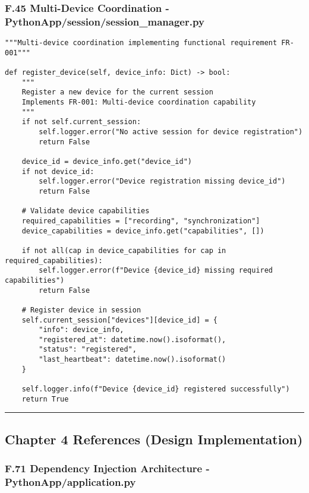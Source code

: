 \documentclass[11pt,a4paper]{article}
\begin{document}
\subsubsection{F.45 Multi-Device Coordination - PythonApp/session/session_manager.py}

\begin{verbatim}
"""Multi-device coordination implementing functional requirement FR-001"""

def register_device(self, device_info: Dict) -> bool:
    """
    Register a new device for the current session
    Implements FR-001: Multi-device coordination capability
    """
    if not self.current_session:
        self.logger.error("No active session for device registration")
        return False

    device_id = device_info.get("device_id")
    if not device_id:
        self.logger.error("Device registration missing device_id")
        return False

    # Validate device capabilities
    required_capabilities = ["recording", "synchronization"]
    device_capabilities = device_info.get("capabilities", [])

    if not all(cap in device_capabilities for cap in required_capabilities):
        self.logger.error(f"Device {device_id} missing required capabilities")
        return False

    # Register device in session
    self.current_session["devices"][device_id] = {
        "info": device_info,
        "registered_at": datetime.now().isoformat(),
        "status": "registered",
        "last_heartbeat": datetime.now().isoformat()
    }

    self.logger.info(f"Device {device_id} registered successfully")
    return True
\end{verbatim}

\hrule

\subsection{Chapter 4 References (Design Implementation)}

\subsubsection{F.71 Dependency Injection Architecture - PythonApp/application.py}
\end{document}
